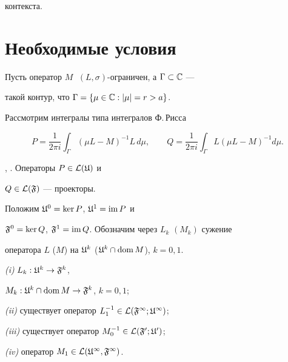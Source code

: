 контекста. 


 




\section{Необходимые условия} 


Пусть оператор $M\;$ $(L,\sigma)$-ограничен, а $\Gamma\subset\Bbb C$ --- 


такой контур, что $\Gamma=\{\mu\in\Bbb C:|\mu|=r>a\}$. 


Рассмотрим интегралы типа интегралов Ф.\,Рисса 


\begin{equation} 


P=\frac{1}{2\pi i}\int_\Gamma(\mu L-M)^{-1}L\,d\mu,\qquad 


Q=\frac{1}{2\pi i}\int_\Gamma L(\mu L-M)^{-1}d\mu. 


\end{equation} 


 




\begin{lems} \cite{S4}, \cite{Bo}. Операторы $P\in\cal L(\frak U)$ и 


$Q\in\cal L(\frak F)$ --- проекторы. 


\end{lems} 


 


Положим $\frak U^0=\ker P$, $\frak U^1=\operatorname{im} P$ и 


$\frak F^0=\ker Q$, $\frak F^1=\operatorname{im} Q$. Обозначим через $L_k$ $(M_k)$ сужение 


оператора $L$ ($M$) на $\frak U^k$ ($\frak U^k\cap\operatorname{dom} M$), $k=0,1$. 


 




\begin{thms} {\em (i)} $L_k:\frak U^k\to\frak F^k$, 


$M_k:\frak U^k\cap\operatorname{dom} M\to \frak F^k$, $k=0,1$; 





{\em (ii)} существует оператор $L_1^{-1}\in\cal L(\frak F^1;\frak U^1)$; 





{\em (iii)} существует оператор $M_0^{-1}\in\cal L(\frak F^0;\frak U^0)$; 





{\em (iv)} оператор $M_1\in\cal L(\frak U^1,\frak F^1)$. 


\end{thms} 


